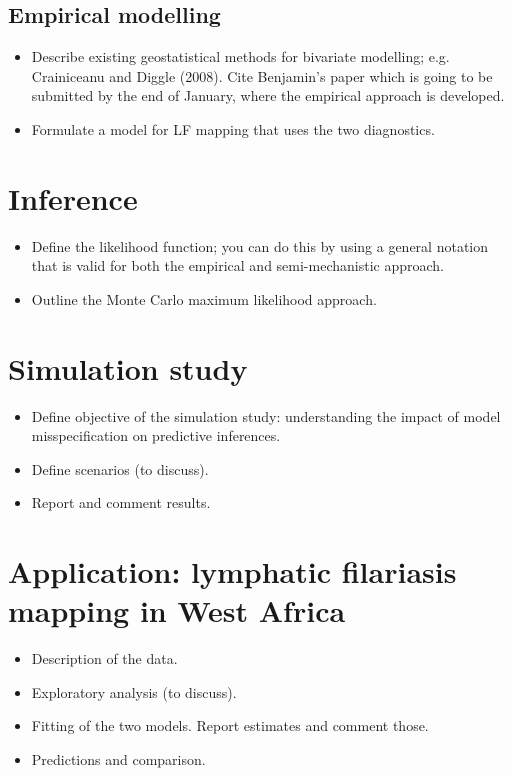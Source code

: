 \documentclass[12pt,a4paper]{article}
\begin{document}
\subsection{Empirical modelling}
\label{subsec:empirical}
\begin{itemize}
\item Describe existing geostatistical methods for bivariate modelling; e.g. Crainiceanu and Diggle (2008). Cite Benjamin's paper which is going to be submitted by the end of January, where the empirical approach is developed. 
\item Formulate a model for LF mapping that uses the two diagnostics. 
\end{itemize}

\section{Inference}
\label{sec:inference}
\begin{itemize}
\item Define the likelihood function; you can do this by using a general notation that is valid for both the empirical and semi-mechanistic approach. 
\item Outline the Monte Carlo maximum likelihood approach.
\end{itemize}

\section{Simulation study}
\label{sec:simulation}
\begin{itemize}
\item Define objective of the simulation study: understanding the impact of model misspecification on predictive inferences. 
\item Define scenarios (to discuss).
\item Report and comment results.
\end{itemize}

\section{Application: lymphatic filariasis mapping in West Africa}
\label{sec:application}
\begin{itemize}
\item Description of the data.
\item Exploratory analysis (to discuss).
\item Fitting of the two models. Report estimates and comment those. 
\item Predictions and comparison.
\end{itemize}
\end{document}
